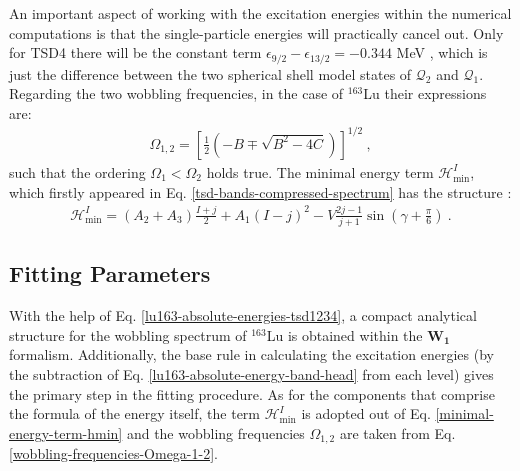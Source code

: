 An important aspect of working with the excitation energies within the numerical computations is that the single-particle energies will practically cancel out. Only for TSD4 there will be the constant term $\epsilon_{9/2}-\epsilon_{13/2}=-0.344$ MeV \cite{raduta2020towards}, which is just the difference between the two spherical shell model states of $\mathcal{Q}_2$ and $\mathcal{Q}_1$. Regarding the two wobbling frequencies, in the case of $^{163}$Lu their expressions are:
\begin{align}
    \Omega_{1,2}=\left[\frac{1}{2}\left(-B\mp\sqrt{B^2-4C}\right)\right]^{1/2}\ ,
    \label{wobbling-frequencies-Omega-1-2}
\end{align}
such that the ordering $\Omega_1<\Omega_2$ holds true. The minimal energy term $\mathcal{H}_\text{min}^I$, which firstly appeared in Eq. \ref{tsd-bands-compressed-spectrum} has the structure \cite{poenaru2021extensive1}:
\begin{align}
    \mathcal{H}_\text{min}^I=\left(A_2+A_3\right)\frac{I+j}{2}+A_1(I-j)^2-V\frac{2j-1}{j+1}\sin\left(\gamma+\frac{\pi}{6}\right)\ .
    \label{minimal-energy-term-hmin}
\end{align}

\subsection{Fitting Parameters}

With the help of Eq. \ref{lu163-absolute-energies-tsd1234}, a compact analytical structure for the wobbling spectrum of $^{163}$Lu is obtained within the $\mathbf{W_1}$ formalism. Additionally, the base rule in calculating the excitation energies (by the subtraction of Eq. \ref{lu163-absolute-energy-band-head} from each level) gives the primary step in the fitting procedure. As for the components that comprise the formula of the energy itself, the term $\mathcal{H}_\text{min}^I$ is adopted out of Eq. \ref{minimal-energy-term-hmin} and the wobbling frequencies $\Omega_{1,2}$ are taken from Eq. \ref{wobbling-frequencies-Omega-1-2}. 

